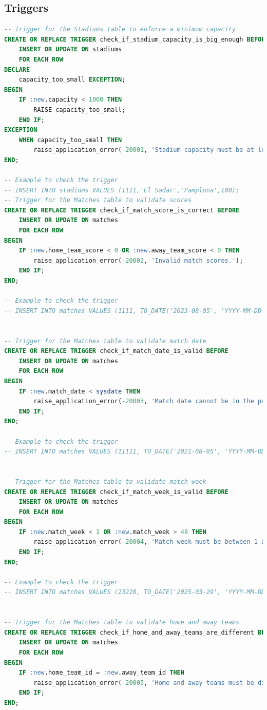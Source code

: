 \documentclass[11pt]{article}
\begin{document}
\subsection{Triggers}
\begin{lstlisting}[language=SQL, caption=\small Triggers (\texttt{DBTriggers.sql} file)]
-- Trigger for the Stadiums table to enforce a minimum capacity
CREATE OR REPLACE TRIGGER check_if_stadium_capacity_is_big_enough BEFORE
    INSERT OR UPDATE ON stadiums
    FOR EACH ROW
DECLARE
    capacity_too_small EXCEPTION;
BEGIN
    IF :new.capacity < 1000 THEN
        RAISE capacity_too_small;
    END IF;
EXCEPTION
    WHEN capacity_too_small THEN
        raise_application_error(-20001, 'Stadium capacity must be at least 1000.');
END;

-- Example to check the trigger
-- INSERT INTO stadiums VALUES (1111,'El Sadar','Pamplona',100);
-- Trigger for the Matches table to validate scores
CREATE OR REPLACE TRIGGER check_if_match_score_is_correct BEFORE
    INSERT OR UPDATE ON matches
    FOR EACH ROW
BEGIN
    IF :new.home_team_score < 0 OR :new.away_team_score < 0 THEN
        raise_application_error(-20002, 'Invalid match scores.');
    END IF;
END;

-- Example to check the trigger
-- INSERT INTO matches VALUES (1111, TO_DATE('2023-08-05', 'YYYY-MM-DD'), -3, 2, 'Antonio Mateu Lahoz', 1, 1, 2, 1);


-- Trigger for the Matches table to validate match date
CREATE OR REPLACE TRIGGER check_if_match_date_is_valid BEFORE
    INSERT OR UPDATE ON matches
    FOR EACH ROW
BEGIN
    IF :new.match_date < sysdate THEN
        raise_application_error(-20003, 'Match date cannot be in the past.');
    END IF;
END;

-- Example to check the trigger
-- INSERT INTO matches VALUES (11111, TO_DATE('2021-08-05', 'YYYY-MM-DD'), 3, 2, 'Antonio Mateu Lahoz', 1, 1, 2, 1);


-- Trigger for the Matches table to validate match week
CREATE OR REPLACE TRIGGER check_if_match_week_is_valid BEFORE
    INSERT OR UPDATE ON matches
    FOR EACH ROW
BEGIN
    IF :new.match_week < 1 OR :new.match_week > 48 THEN
        raise_application_error(-20004, 'Match week must be between 1 and 38.');
    END IF;
END;

-- Example to check the trigger
-- INSERT INTO matches VALUES (23228, TO_DATE('2025-03-29', 'YYYY-MM-DD'), 1, 1, 'Aliyar Aghayev', 410, 5, 2, 5);


-- Trigger for the Matches table to validate home and away teams
CREATE OR REPLACE TRIGGER check_if_home_and_away_teams_are_different BEFORE
    INSERT OR UPDATE ON matches
    FOR EACH ROW
BEGIN
    IF :new.home_team_id = :new.away_team_id THEN
        raise_application_error(-20005, 'Home and away teams must be different.');
    END IF;
END;


\end{lstlisting}
\end{document}
